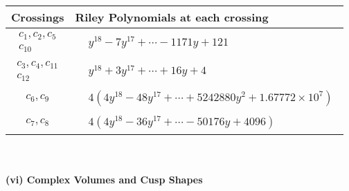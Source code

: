 \documentclass[1p]{elsarticle_modified}
\theoremstyle{definition}
\begin{document}
\begin{tabular}{m{50pt}|m{274pt}}
Crossings & \hspace{64pt}Riley Polynomials at each crossing \\
\hline $$\begin{aligned}c_{1},c_{2},c_{5}\\c_{10}\end{aligned}$$&$\begin{aligned}
&y^{18}-7 y^{17}+\cdots-1171 y+121
\end{aligned}$\\
\hline $$\begin{aligned}c_{3},c_{4},c_{11}\\c_{12}\end{aligned}$$&$\begin{aligned}
&y^{18}+3 y^{17}+\cdots+16 y+4
\end{aligned}$\\
\hline $$\begin{aligned}c_{6},c_{9}\end{aligned}$$&$\begin{aligned}
&4(4 y^{18}-48 y^{17}+\cdots+5242880 y^{2}+1.67772\times10^{7})
\end{aligned}$\\
\hline $$\begin{aligned}c_{7},c_{8}\end{aligned}$$&$\begin{aligned}
&4(4 y^{18}-36 y^{17}+\cdots-50176 y+4096)
\end{aligned}$\\
\hline
\end{tabular}\\~\\
\newpage\flushleft \textbf{(vi) Complex Volumes and Cusp Shapes}
\end{document}
